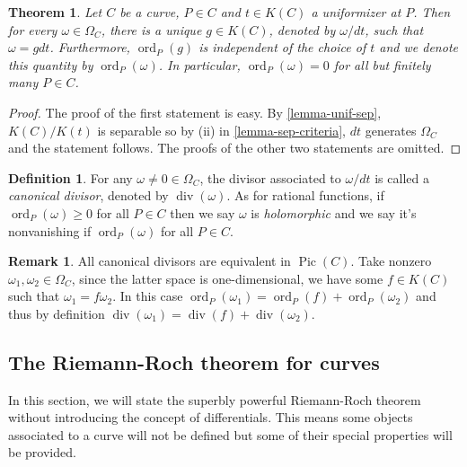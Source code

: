 \documentclass[12pt]{article}
\newtheorem{theorem}{Theorem}[subsection]
\theoremstyle{remark}
\theoremstyle{definition}
\newtheorem{remark}{Remark}[subsection]
\newtheorem{definition}{Definition}[subsection]
\newcommand{\ord}[0]{\operatorname{ord}}
\newcommand{\w}[0]{\omega}
\newcommand{\pdiv}[0]{\operatorname{div}}
\newcommand{\Pic}[0]{\operatorname{Pic}}
\begin{document}
        \begin{theorem}
           Let $C$ be a curve, $P\in C$ and $t\in K(C)$ a uniformizer at $P$. Then for every $\w\in\Omega_C$, there is a unique $g\in K(C)$, denoted by $\w/dt$, such that $\w=gdt$. Furthermore, $\ord_P(g)$ is independent of the choice of $t$ and we denote this quantity by $\ord_P(\w)$. In particular, $\ord_P(\w)=0$ for all but finitely many $P\in C$.
        \end{theorem}
        \begin{proof}
            The proof of the first statement is easy. By \autoref{lemma-unif-sep}, $K(C)/K(t)$ is separable so by (ii) in \autoref{lemma-sep-criteria}, $dt$ generates $\Omega_C$ and the statement follows. The proofs of the other two statements are omitted.
        \end{proof}
        \begin{definition}
            For any $\w\neq 0\in\Omega_C$, the divisor associated to $\w/dt$ is called a \textit{canonical divisor}, denoted by $\pdiv(\w)$. As for rational functions, if $\ord_P(\w)\geqslant 0$ for all $P\in C$ then we say $\w$ is \textit{holomorphic} and we say it's nonvanishing if $\ord_P(\w)$ for all $P\in C$.
        \end{definition}
        \begin{remark}\label{remark-canonical-equiv}
            All canonical divisors are equivalent in $\Pic(C)$. Take nonzero $\w_1,\w_2\in\Omega_C$, since the latter space is one-dimensional, we have some $f\in K(C)$ such that $\w_1=f\w_2$. In this case $\ord_P(\w_1)=\ord_P(f)+\ord_P(\w_2)$ and thus by definition $\pdiv(\w_1)=\pdiv(f)+\pdiv(\w_2)$.
        \end{remark}
    
    
    
    \subsection{The Riemann-Roch theorem for curves}
        In this section, we will state the superbly powerful Riemann-Roch theorem without introducing the concept of differentials. This means some objects associated to a curve will not be defined but some of their special properties will be provided.
\end{document}
